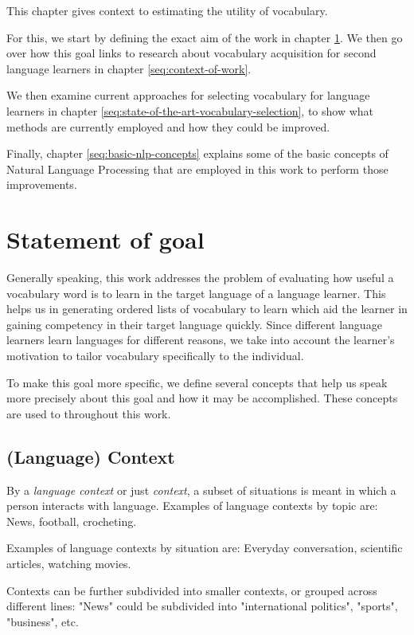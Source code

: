 This chapter gives context to estimating the utility of vocabulary.

For this, we start by defining the exact aim of the work  in chapter \ref{seq:statement-of-goal}.
We then go over how this goal links to research about vocabulary acquisition for second language learners in chapter \ref{seq:context-of-work}.

We then examine current approaches for selecting vocabulary for language learners in chapter \ref{seq:state-of-the-art-vocabulary-selection}, to show what methods are currently employed and how they could be improved.

Finally, chapter \ref{seq:basic-nlp-concepts} explains some of the basic concepts of Natural Language Processing that are employed in this work to perform those improvements.



\section{Statement of goal} \label{seq:statement-of-goal}

Generally speaking, this work addresses the problem of evaluating how useful a vocabulary word is to learn in the target language of a language learner.
This helps us in generating ordered lists of vocabulary to learn which aid the learner in gaining competency in their target language quickly.
Since different language learners learn languages for different reasons, we take into account the learner's motivation to tailor vocabulary specifically to the individual.

To make this goal more specific, we define several concepts that help us speak more precisely about this goal and how it may be accomplished.
These concepts are used to throughout this work.
\subsection{(Language) Context}
By a \textit{language context} or just \textit{context}, a subset of situations is meant in which a person interacts with language.
Examples of language contexts by topic are:
News, football, crocheting.

Examples of language contexts by situation are:
Everyday conversation, scientific articles, watching movies.

Contexts can be further subdivided into smaller contexts, or grouped across different lines:
"News" could be subdivided into "international politics", "sports", "business", etc.

